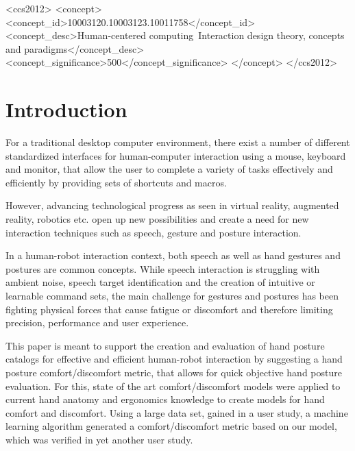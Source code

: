 \documentclass{sig-alternate-05-2015}
\begin{document}
%
%
\begin{CCSXML}
<ccs2012>
<concept>
<concept_id>10003120.10003123.10011758</concept_id>
<concept_desc>Human-centered computing~Interaction design theory, concepts and paradigms</concept_desc>
<concept_significance>500</concept_significance>
</concept>
</ccs2012>
\end{CCSXML}






%
%

%
%
\printccsdesc



\section{Introduction}

For a traditional desktop computer environment, there exist a number of different standardized interfaces for human-computer interaction using a mouse, keyboard and monitor, that allow the user to 
complete a variety of tasks effectively and efficiently by providing sets of shortcuts and macros. 

However, advancing technological progress as seen in virtual reality, augmented reality,
 robotics etc. open up new possibilities and create a need for new interaction techniques such as speech, gesture and posture interaction. 

In a human-robot interaction context, both speech as well as hand gestures and postures are common concepts. While speech interaction is struggling 
with ambient noise, speech target identification and the creation of intuitive or learnable command sets, the main challenge for gestures and postures has been fighting physical forces that cause fatigue or discomfort and therefore limiting precision, performance and user experience.

This paper is meant to support the creation and evaluation of hand posture catalogs for effective and efficient human-robot interaction by suggesting a hand posture comfort/discomfort metric, that allows for quick objective hand posture evaluation. For this, state of the art comfort/discomfort models were applied to current hand anatomy and ergonomics knowledge to create models for hand comfort and discomfort. Using a large data set, gained in a user study, a machine learning algorithm generated a comfort/discomfort metric based on our model, which was verified in yet another user study.
\end{document}
